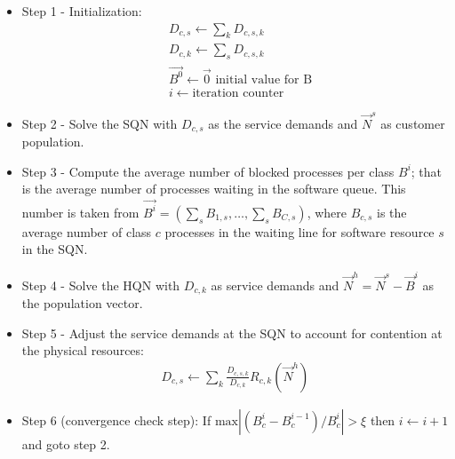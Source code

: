  \begin{itemize} 
\item Step 1 - Initialization:  
\begin{align} 
& D_{c,s} \leftarrow \sum_{k} D_{c,s,k}  \\ 
& D_{c,k} \leftarrow \sum_{s} D_{c,s,k} \label{sum-demands-on-software} \\
&   \vec{B^0} \leftarrow \vec{0} \text{  initial value for B} \\ 
& i \leftarrow \text{iteration counter}
\end{align}  

\item Step 2 - Solve the SQN with $D_{c,s}$ as the service demands and $\vec{N}^s$
 as customer population.
%
\item Step 3 - Compute the average number of blocked processes per class $B^i$; that is the average number of processes waiting in the software queue. This number is taken from $ \vec{B^i} =(\sum_s B_{1,s}, \ldots, \sum_s B_{C,s})$,  
where $B_{c,s}$  is the average number of class $c$ processes in the waiting line for software resource $s$ in the SQN. 

%
\item Step 4 - Solve the HQN with $D_{c,k}$ as service demands and $\vec{N}^h = \vec{N}^s - \vec{B}^i$ as the population vector. 
%
\item Step 5 - Adjust the service demands at the SQN to account for contention at the physical resources: 
\begin{align} 
  D_{c,s} \leftarrow \sum_k \frac{D_{c,s,k}}{D_{c,k}} R_{c,k}(\vec{N}^h)  
\end{align} 

\item Step 6 (convergence check step): 
If $\text{max}|(B^i_c-B^{i-1}_c)/B^i_c |>\xi$ then $i\leftarrow i+1$ and goto step 2. 
 \end{itemize}  
